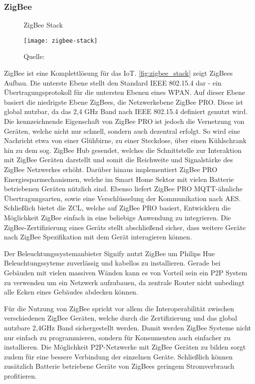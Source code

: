\subsubsection{ZigBee}

\begin{wrapfigure}{r}{0.4\textwidth}
	\centering
	\caption{ZigBee Stack}
	\texttt{[image: zigbee-stack]}
	\caption*{\footnotesize{Quelle: }}
	\label{fig:zigbee_stack}
\end{wrapfigure}

ZigBee ist eine Komplettlösung für das \ac{IoT}.
\autoref{fig:zigbee_stack} zeigt ZigBees Aufbau.
Die unterste Ebene stellt den Standard IEEE 802.15.4 dar - ein Übertragungsprotokoll für die untersten Ebenen eines \ac{WPAN}.
Auf dieser Ebene basiert die niedrigste Ebene ZigBees, die Netzwerkebene ZigBee PRO.
Diese ist global nutzbar, da das 2,4 GHz Band nach IEEE 802.15.4 definiert genutzt wird.
Die kennzeichnende Eigenschaft von ZigBee PRO ist jedoch die Vernetzung von Geräten, welche nicht nur schnell, sondern auch dezentral erfolgt.
So wird eine Nachricht etwa von einer Glühbirne, zu einer Steckdose, über einen Kühlschrank hin zu dem sog. ZigBee Hub gesendet, welches die Schnittstelle zur Interaktion mit ZigBee Geräten darstellt und somit die Reichweite und Signalstärke des ZigBee Netzwerkes erhöht.
Darüber hinaus implementiert ZigBee PRO Energiesparmechanismen, welche im Smart Home Sektor mit vielen Batterie betriebenen Geräten nützlich sind.
Ebenso liefert ZigBee PRO \ac{MQTT}-ähnliche Übertragungsarten, sowie eine Verschlüsselung der Kommunikation nach \ac{AES}.
Schließlich bietet die \ac{ZCL}, welche auf ZigBee PRO basiert, Entwicklern die Möglichkeit ZigBee einfach in eine beliebige Anwendung zu integrieren.
Die ZigBee-Zertifizierung eines Geräts stellt abschließend sicher, dass weitere Geräte nach ZigBee Spezifikation mit dem Gerät interagieren können.

Der Beleuchtungssystemanbieter Signify nutzt ZigBee um Philips Hue Beleuchtungssyteme zuverlässig und kabellos zu installieren.
Gerade bei Gebäuden mit vielen massiven Wänden kann es von Vorteil sein ein \ac{P2P} System zu verwenden um ein Netzwerk aufzubauen, da zentrale Router nicht unbedingt alle Ecken eines Gebäudes abdecken können.

Für die Nutzung von ZigBee spricht vor allem die Interoperabilität zwischen verschiedenen ZigBee Geräten, welche durch die Zertifizierung und das global nutzbare 2,4GHz Band sichergestellt werden.
Damit werden ZigBee Systeme nicht nur einfach zu programmieren, sondern für Konsumenten auch einfacher zu installieren.
Die Möglichkeit \ac{P2P}-Netzwerke mit ZigBee Geräten zu bilden sorgt zudem für eine bessere Verbindung der einzelnen Geräte.
Schließlich können zusätzlich Batterie betriebene Geräte von ZigBees geringem Stromverbrauch profitieren.


